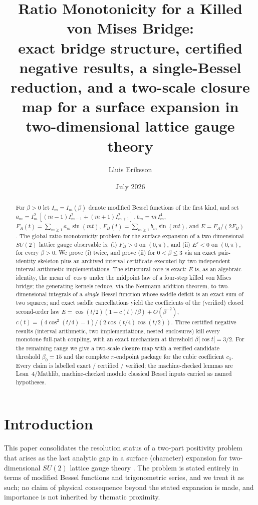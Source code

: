 \documentclass[11pt]{article}
\title{Ratio Monotonicity for a Killed von Mises Bridge:\\
\large exact bridge structure, certified negative results, a single-Bessel
reduction, and a two-scale closure map for a surface expansion in
two-dimensional lattice gauge theory}
\author{Lluis Eriksson}
\date{July 2026}
\theoremstyle{remark}
\newcommand{\FA}{F_{\!A}}
\newcommand{\FB}{F_{\!B}}
\begin{document}
\maketitle

\begin{abstract}
For $\beta>0$ let $I_m=I_m(\beta)$ denote modified Bessel functions of the
first kind, and set $a_m = I_m^2\,[(m-1)I_{m-1}^2+(m+1)I_{m+1}^2]$,
$b_m = m\,I_m^4$, $\FA(t)=\sum_{m\ge1}a_m\sin(mt)$,
$\FB(t)=\sum_{m\ge1}b_m\sin(mt)$, and $E=\FA/(2\FB)$. The global
ratio-monotonicity problem for the surface expansion of a two-dimensional
$SU(2)$ lattice gauge observable is: (i) $\FB>0$ on $(0,\pi)$, and (ii)
$E'<0$ on $(0,\pi)$, for every $\beta>0$. We prove (i) twice, and prove (ii) for $0<\beta\le3$ via an exact
pair-identity skeleton plus an archived interval certificate executed by
two independent interval-arithmetic implementations. The
structural core is exact: $E$ is, as an algebraic identity, the mean of
$\cos\psi$ under the midpoint law of a four-step killed von Mises
bridge; the generating kernels reduce, via the Neumann addition theorem,
to two-dimensional integrals of a \emph{single} Bessel function whose
saddle deficit is an exact sum of two squares; and exact saddle
cancellations yield the coefficients of the (verified) closed
second-order law $E=\cos(t/2)(1-c(t)/\beta)+O(\beta^{-2})$,
$c(t)=(4\cos^2(t/4)-1)/(2\cos(t/4)\cos(t/2))$. Three certified negative
results (interval arithmetic, two implementations, nested enclosures)
kill every monotone full-path coupling, with an exact mechanism at
threshold $\beta|\cos t|=3/2$. For the remaining range we give a
two-scale closure map with a verified candidate threshold $\beta_0=15$
and the complete $\pi$-endpoint package for the cubic coefficient
$c_3$. Every claim is labelled exact / certified / verified; the
machine-checked lemmas are Lean~4/Mathlib, machine-checked modulo
classical Bessel inputs carried as named hypotheses.
\end{abstract}

\section{Introduction}

This paper consolidates the resolution status of a two-part positivity
problem that arises as the last analytic gap in a surface (character)
expansion for two-dimensional $SU(2)$ lattice gauge theory
\cite{Companion,PhiLemma,WronskianNote}. The problem is stated entirely in
terms of modified Bessel functions and trigonometric series, and we treat
it as such; no claim of physical consequence beyond the stated expansion
is made, and importance is not inherited by thematic proximity.
\end{document}

